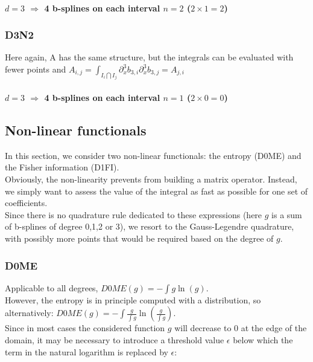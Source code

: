 \documentclass[paper=a4, fontsize=11pt]{book}
\numberwithin{equation}{section}		%
\numberwithin{figure}{section}			%
\numberwithin{table}{section}				%
\begin{document}
\begin{landscape}
\paragraph{\textbf{$d=3$ $\Rightarrow$ 4 b-splines on each interval $n=2$ ($2\times1=2$)}}

\subsubsection{D3N2}
Here again, A has the same structure, but the integrals can be evaluated with fewer points and $A_{i,j} = \int_{I_i\bigcap I_j}\partial^3_xb_{3,i}\partial^3_xb_{3,j} = A_{j,i}$
\paragraph{\textbf{$d=3$ $\Rightarrow$ 4 b-splines on each interval $n=1$ ($2\times0=0$)}}

\end{landscape}
\newpage
\subsection{Non-linear functionals}

In this section, we consider two non-linear functionals: the entropy (D0ME) and the Fisher information (D1FI).\\
Obviously, the non-linearity prevents from building a matrix operator. Instead, we simply want to assess the value of the integral as fast as possible for one set of coefficients.\\
Since there is no quadrature rule dedicated to these expressions (here $g$ is a sum of b-splines of degree 0,1,2 or 3), we resort to the Gauss-Legendre quadrature, with possibly more points that would be required based on the degree of $g$.


\subsubsection{D0ME}

Applicable to all degrees, $D0ME\left(g\right) = -\int g\ln(g)$.\\
However, the entropy is in principle computed with a distribution, so alternatively: $D0ME\left(g\right) = -\int \frac{g}{\int g}\ln\left(\frac{g}{\int g}\right)$.\\

Since in most cases the considered function $g$ will decrease to 0 at the edge of the domain, it may be necessary to introduce a threshold value $\epsilon$ below which the term in the natural logarithm is replaced by $\epsilon$:
\end{document}
